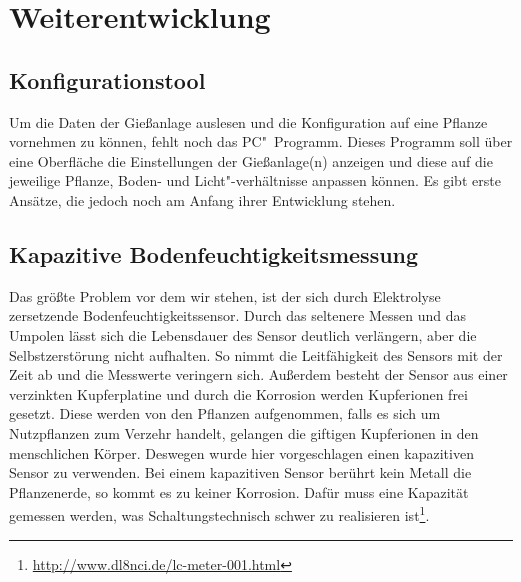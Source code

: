 
\section{Weiterentwicklung}
\subsection{Konfigurationstool}
Um die Daten der Gießanlage auslesen und die Konfiguration auf eine Pflanze vornehmen zu können, fehlt noch das PC"~Programm. 
Dieses Programm soll über eine Oberfläche die Einstellungen der Gießanlage(n) anzeigen und diese auf die jeweilige Pflanze, Boden- und Licht"-verhältnisse anpassen können.
Es gibt erste Ansätze, die jedoch noch am Anfang ihrer Entwicklung stehen.

\subsection{Kapazitive Bodenfeuchtigkeitsmessung}
Das größte Problem vor dem wir stehen, ist der sich durch Elektrolyse zersetzende Bodenfeuchtigkeitssensor.
Durch das seltenere Messen und das Umpolen lässt sich die Lebensdauer des Sensor deutlich verlängern, aber die Selbstzerstörung nicht aufhalten.
So nimmt die Leitfähigkeit des Sensors mit der Zeit ab und die Messwerte veringern sich.
Außerdem besteht der Sensor aus einer verzinkten Kupferplatine und durch die Korrosion werden Kupferionen frei gesetzt. 
Diese werden von den Pflanzen aufgenommen, falls es sich um Nutzpflanzen zum Verzehr handelt, gelangen die giftigen Kupferionen in den menschlichen Körper.
Deswegen wurde hier vorgeschlagen einen kapazitiven Sensor zu verwenden. 
Bei einem kapazitiven Sensor berührt kein Metall die Pflanzenerde, so kommt es zu keiner Korrosion.
Dafür muss eine Kapazität gemessen werden, was Schaltungstechnisch schwer zu realisieren ist\footnote{\href{http://www.dl8nci.de/lc-meter-001.html}{http://www.dl8nci.de/lc-meter-001.html}}.
 
